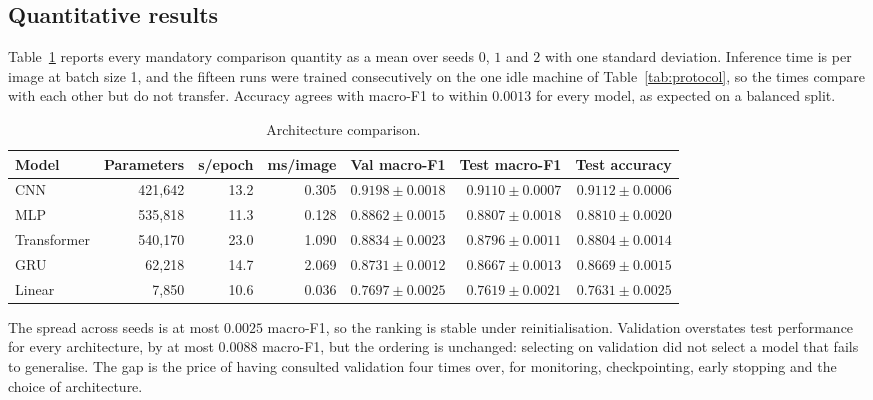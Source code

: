 \subsection{Quantitative results}
\label{subsec:results-2}

Table~\ref{tab:results} reports every mandatory comparison quantity as a mean over seeds $0$,
$1$ and $2$ with one standard deviation. Inference time is per image at batch size 1, and the
fifteen runs were trained consecutively on the one idle machine of Table~\ref{tab:protocol}, so
the times compare with each other but do not transfer. Accuracy agrees with macro-F1 to within
$0.0013$ for every model, as expected on a balanced split.

\begin{table}[H]
\centering
\caption{Architecture comparison.}
\label{tab:results}
\footnotesize
\begin{tabular}{lrrrrrr}
\hline
\textbf{Model} & \textbf{Parameters} & \textbf{s/epoch} & \textbf{ms/image} & \textbf{Val macro-F1} & \textbf{Test macro-F1} & \textbf{Test accuracy} \\
\hline
CNN         & 421{,}642 & 13.2 & 0.305 & $\mathbf{0.9198 \pm 0.0018}$ & $\mathbf{0.9110 \pm 0.0007}$ & $\mathbf{0.9112 \pm 0.0006}$ \\
MLP         & 535{,}818 & 11.3 & 0.128 & $0.8862 \pm 0.0015$ & $0.8807 \pm 0.0018$ & $0.8810 \pm 0.0020$ \\
Transformer & 540{,}170 & 23.0 & 1.090 & $0.8834 \pm 0.0023$ & $0.8796 \pm 0.0011$ & $0.8804 \pm 0.0014$ \\
GRU         &  62{,}218 & 14.7 & 2.069 & $0.8731 \pm 0.0012$ & $0.8667 \pm 0.0013$ & $0.8669 \pm 0.0015$ \\
Linear      &   7{,}850 & 10.6 & 0.036 & $0.7697 \pm 0.0025$ & $0.7619 \pm 0.0021$ & $0.7631 \pm 0.0025$ \\
\hline
\end{tabular}
\end{table}

The spread across seeds is at most $0.0025$ macro-F1, so the ranking is stable under
reinitialisation. Validation overstates test performance for every architecture, by at most
$0.0088$ macro-F1, but the ordering is unchanged: selecting on validation did not select a model
that fails to generalise. The gap is the price of having consulted validation four times over,
for monitoring, checkpointing, early stopping and the choice of architecture.

